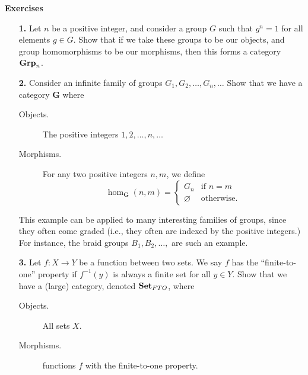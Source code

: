     {\large \textbf{Exercises}
    \vspace{0.2cm}}
    \begin{itemize}
        \item[\textbf{1.}] 
        Let $n$ be a positive integer, and consider a group $G$ such that 
        $g^n = 1$ for all elements $g \in G$. Show that if we take these groups to be 
        our objects, and group homomorphisms to be our morphisms, then 
        this forms a category $\operatorname{\mathbf{Grp}}_n$.
        \vspace{0.2cm}

        \item[\textbf{2.}] 
        Consider an infinite family of groups $G_1, G_2, \dots, G_n, \dots$
        Show that we have a category $\textbf{G}$ where
        \begin{description}
            \item[Objects.] The positive integers $1, 2, \dots, n, \dots$
            \item[Morphisms.] For any two positive integers $n,m$,  
            we define 
            \[
                \hom_{\textbf{G}}(n,m) = 
                \begin{cases}
                    G_n & \text{if } n = m\\
                    \varnothing & \text{otherwise}.
                \end{cases}  
            \] 
        \end{description}
        This example can be applied to many interesting families of groups, since they 
        often come graded (i.e., they often are indexed by the positive integers.)
        For instance, the braid groups $B_1, B_2, \dots,$ are such an example.
        \vspace{0.2cm}

        \item[\textbf{3.}] 
        Let $f: X \to Y$ be a function between two sets. 
        We say $f$ has the ``finite-to-one'' property if $f^{-1}(y)$ is always a 
        finite set for all $y \in Y$. Show that we have a (large) category,  denoted 
        $\operatorname{\mathbf{Set}}_{FTO}$, where 
        \begin{description}
            \item[Objects.] All sets $X$.
            \item[Morphisms.] functions $f$ with the finite-to-one property. 
        \end{description}
        \vspace{0.2cm}


\end{itemize}
